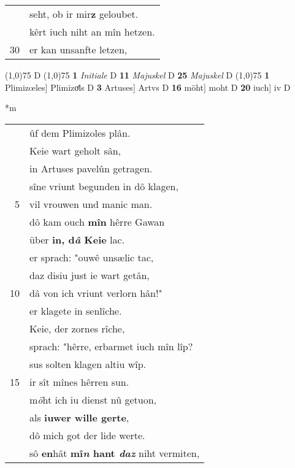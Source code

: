 \documentclass[8pt,a4paper,notitlepage]{article}
\begin{document}
\begin{table}[ht]
\begin{minipage}[t]{0.5\linewidth}
\begin{tabular}{rl}
 & seht, ob ir mir\textbf{z} geloubet.\\ 
 & kêrt iuch niht an mîn hetzen.\\ 
30 & er kan unsanfte letzen,\\ 
\end{tabular}
\scriptsize
\line(1,0){75} \newline
D \newline
\line(1,0){75} \newline
\textbf{1} \textit{Initiale} D  \textbf{11} \textit{Majuskel} D  \textbf{25} \textit{Majuskel} D  \newline
\line(1,0){75} \newline
\textbf{1} Plimizœles] Plimizoͤls D \textbf{3} Artuses] Artvs D \textbf{16} möht] moht D \textbf{20} iuch] iv D \newline
\end{minipage}
\hspace{0.5cm}
\begin{minipage}[t]{0.5\linewidth}
\small
\begin{center}*m
\end{center}
\begin{tabular}{rl}
 & ûf dem Plimizoles plân.\\ 
 & Keie wart geholt sân,\\ 
 & in Artuses pavelûn getragen.\\ 
 & sîne vriunt begunden in dô klagen,\\ 
5 & vil vrouwen und manic man.\\ 
 & dô kam ouch \textbf{mîn} hêrre Gawan\\ 
 & über \textbf{in, d\textit{â} Keie} lac.\\ 
 & er sprach: "ouwê unsælic tac,\\ 
 & daz disiu just ie wart getân,\\ 
10 & dâ von ich vriunt verlorn hân!"\\ 
 & er klagete in senlîche.\\ 
 & Keie, der zornes rîche,\\ 
 & sprach: "hêrre, erbarmet iuch mîn lîp?\\ 
 & sus solten klagen altiu wîp.\\ 
15 & ir sît mînes hêrren sun.\\ 
 & m\textit{ö}ht ich iu dienst nû getuon,\\ 
 & als \textbf{iuwer wille gerte},\\ 
 & dô mich got der lide werte.\\ 
 & sô \textbf{en}hât \textbf{mî\textit{n} hant \textit{daz}} niht vermiten,\\ 

\end{tabular}
\end{minipage}
\end{table}
\end{document}
